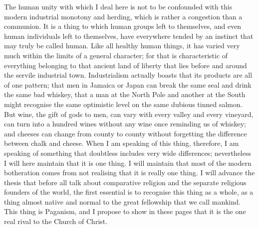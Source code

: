 The human unity with which I deal here is not to be confounded with this modern industrial monotony and herding, which is rather a congestion than a communion. It is a thing to which human groups left to themselves, and even human individuals left to themselves, have everywhere tended by an instinct that may truly be called human. Like all healthy human things, it has varied very much within the limits of a general character; for that is characteristic of everything belonging to that ancient land of liberty that lies before and around the servile industrial town. Industrialism actually boasts that its products are all of one pattern; that men in Jamaica or Japan can break the same seal and drink the same bad whiskey, that a man at the North Pole and another at the South might recognise the same optimistic level on the same dubious tinned salmon. But wine, the gift of gods to men, can vary with every valley and every vineyard, can turn into a hundred wines without any wine once reminding us of whiskey; and cheeses can change from county to county without forgetting the difference between chalk and cheese. When I am speaking of this thing, therefore, I am speaking of something that doubtless includes very wide differences; nevertheless I will here maintain that it is one thing. I will maintain that most of the modern botheration comes from not realising that it is really one thing. I will advance the thesis that before all talk about comparative religion and the separate religious founders of the world, the first essential is to recognise this thing as a whole, as a thing almost native and normal to the great fellowship that we call mankind. This thing is Paganism, and I propose to show in these pages that it is the one real rival to the Church of Christ.

